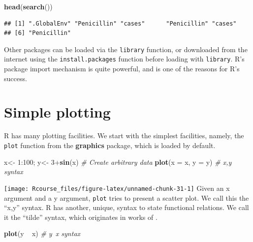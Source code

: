 \documentclass[]{book}
\newenvironment{Shaded}{\begin{snugshade}}{\end{snugshade}}
\newcommand{\KeywordTok}[1]{\textcolor[rgb]{0.13,0.29,0.53}{\textbf{{#1}}}}
\newcommand{\DataTypeTok}[1]{\textcolor[rgb]{0.13,0.29,0.53}{{#1}}}
\newcommand{\DecValTok}[1]{\textcolor[rgb]{0.00,0.00,0.81}{{#1}}}
\newcommand{\StringTok}[1]{\textcolor[rgb]{0.31,0.60,0.02}{{#1}}}
\newcommand{\CommentTok}[1]{\textcolor[rgb]{0.56,0.35,0.01}{\textit{{#1}}}}
\newcommand{\NormalTok}[1]{{#1}}
\theoremstyle{definition}
\theoremstyle{definition}
\theoremstyle{remark}
\begin{document}
\begin{Shaded}
\begin{Highlighting}[]
\KeywordTok{head}\NormalTok{(}\KeywordTok{search}\NormalTok{())}
\end{Highlighting}
\end{Shaded}

\begin{verbatim}
## [1] ".GlobalEnv" "Penicillin" "cases"      "Penicillin" "cases"     
## [6] "Penicillin"
\end{verbatim}

Other packages can be loaded via the \texttt{library} function, or
downloaded from the internet using the \texttt{install.packages}
function before loading with \texttt{library}. R's package import
mechanism is quite powerful, and is one of the reasons for R's success.

\section{Simple plotting}\label{simple-plotting}

R has many plotting facilities. We start with the simplest facilities,
namely, the \texttt{plot} function from the \textbf{graphics} package,
which is loaded by default.

\begin{Shaded}
\begin{Highlighting}[]
\NormalTok{x<-}\StringTok{ }\DecValTok{1}\NormalTok{:}\DecValTok{100}\NormalTok{; y<-}\StringTok{ }\DecValTok{3}\NormalTok{+}\KeywordTok{sin}\NormalTok{(x) }\CommentTok{# Create arbitrary data}
\KeywordTok{plot}\NormalTok{(}\DataTypeTok{x =} \NormalTok{x, }\DataTypeTok{y =} \NormalTok{y) }\CommentTok{# x,y syntax                         }
\end{Highlighting}
\end{Shaded}

\texttt{[image: Rcourse\_files/figure-latex/unnamed-chunk-31-1]}
Given an x argument and a y argument, \texttt{plot} tries to present a
scatter plot. We call this the ``x,y'' syntax. R has another, unique,
syntax to state functional relations. We call it the ``tilde'' syntax,
which originates in works of \citet{wilkinson1973symbolic}.

\begin{Shaded}
\begin{Highlighting}[]
\KeywordTok{plot}\NormalTok{(y ~}\StringTok{ }\NormalTok{x) }\CommentTok{# y~x syntax }
\end{Highlighting}
\end{Shaded}
\end{document}
